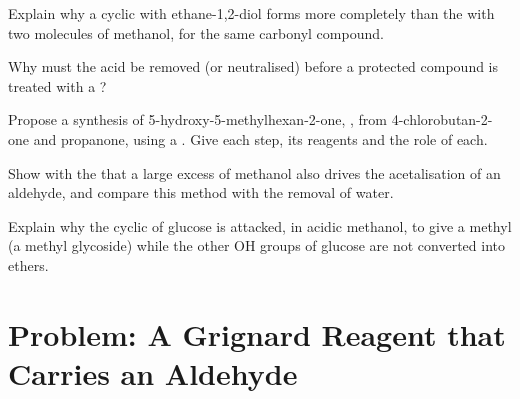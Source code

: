\begin{exercise}[$\star\star$]\label{exo:b1:acetals-protection:8}
Explain why a cyclic  with ethane-1,2-diol forms more completely
than the  with two molecules of methanol, for the same carbonyl
compound.
\end{exercise}

\begin{exercise}[$\star\star$]\label{exo:b1:acetals-protection:9}
Why must the acid  be removed (or neutralised) before a protected
compound is treated with a ?
\end{exercise}

\begin{exercise}[$\star\star\star$]\label{exo:b1:acetals-protection:10}
Propose a synthesis of 5-hydroxy-5-methylhexan-2-one,
, from 4-chlorobutan-2-one and propanone, using
a . Give each step, its reagents and the role of each.
\end{exercise}

\begin{exercise}[$\star\star\star$]\label{exo:b1:acetals-protection:11}
Show with the  that a large excess of methanol also
drives the acetalisation of an aldehyde, and compare this method with the
removal of water.
\end{exercise}

\begin{exercise}[$\star\star\star$]\label{exo:b1:acetals-protection:12}
Explain why the cyclic  of glucose is attacked, in acidic
methanol, to give a methyl  (a methyl glycoside) while the other OH
groups of glucose are not converted into ethers.
\end{exercise}

\section{Problem: A Grignard Reagent that Carries an Aldehyde}

